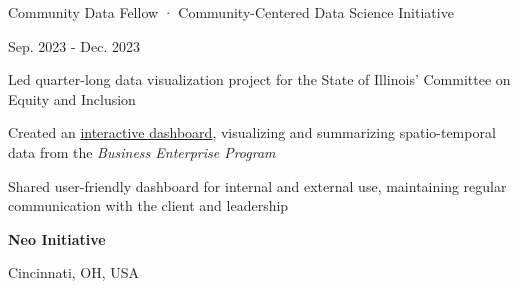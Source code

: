     \begin{minipage}{.75\linewidth} \begin{flushleft}
    		Community Data Fellow · Community-Centered Data Science Initiative
    	\end{flushleft} \end{minipage}
    \hfill 
    \begin{minipage}{.20\linewidth}\begin{flushright}
    	 Sep. 2023 - Dec. 2023
    	\end{flushright}\end{minipage}
        \vspace{-5pt}
	\begin{description}[font=$\bullet$]
 \item{Led quarter-long data visualization project for the State of Illinois' Committee on Equity and Inclusion}
 \vspace{-6pt}
 \item{Created an \href{https://public.tableau.com/app/profile/daniel.posmik/viz/DSI_CEI_Dashboard_draft/Dashboard1}{interactive dashboard}, visualizing and summarizing spatio-temporal data from the \textit{Business Enterprise Program}}
 \vspace{-6pt}
 \item{Shared user-friendly dashboard for internal and external use, maintaining regular communication with the client and leadership}
\end{description}

    \begin{minipage}{.75\linewidth} \begin{flushleft}
    		\textbf{Neo Initiative}
    	\end{flushleft} \end{minipage}
    \hfill 
    \begin{minipage}{.20\linewidth}\begin{flushright}
    	 Cincinnati, OH, USA
    	\end{flushright}\end{minipage}
     
